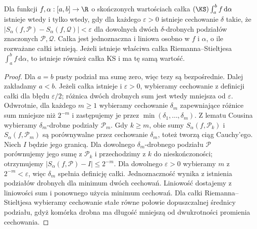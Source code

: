 \begin{twierdzenie}
\label{tw:ks-cauchy}
Dla funkcji $f,\alpha:[a,b]\to\R$ o skończonych wartościach całka $(\KS)\int_a^b f\,\mathrm d\alpha$ istnieje wtedy i tylko wtedy, gdy dla każdego $\varepsilon>0$ istnieje cechowanie $\delta$ takie, że
$|S_\alpha(f,\mathcal P)-S_\alpha(f,\mathcal Q)|<\varepsilon$ dla dowolnych dwóch $\delta$-drobnych podziałów znaczonych $\mathcal P,\mathcal Q$. Całka jest jednoznaczna i liniowa osobno w $f$ i $\alpha$, o ile rozważane całki istnieją. Jeżeli istnieje właściwa całka Riemanna--Stieltjesa $\int_a^b f\,\mathrm d\alpha$, to istnieje również całka KS i ma tę samą wartość.
\end{twierdzenie}
\begin{proof}
Dla $a=b$ pusty podział ma sumę zero, więc tezy są bezpośrednie. Dalej zakładamy $a<b$. Jeżeli całka istnieje i $\varepsilon>0$, wybieramy cechowanie z definicji całki dla błędu $\varepsilon/2$; różnica dwóch drobnych sum jest wtedy mniejsza od $\varepsilon$. Odwrotnie, dla każdego $m\ge1$ wybieramy cechowanie $\delta_m$ zapewniające różnice sum mniejsze niż $2^{-m}$ i zastępujemy je przez $\min(\delta_1,\ldots,\delta_m)$. Z lematu Cousina wybieramy $\delta_m$-drobne podziały $\mathcal P_m$. Gdy $k\ge m$, obie sumy $S_\alpha(f,\mathcal P_k)$ i $S_\alpha(f,\mathcal P_m)$ są porównywalne przez cechowanie $\delta_m$, toteż tworzą ciąg Cauchy'ego. Niech $I$ będzie jego granicą. Dla dowolnego $\delta_m$-drobnego podziału $\mathcal P$ porównujemy jego sumę z $\mathcal P_k$ i przechodzimy z $k$ do nieskończoności; otrzymujemy $|S_\alpha(f,\mathcal P)-I|\le2^{-m}$. Dla dowolnego $\varepsilon>0$ wybieramy $m$ z $2^{-m}<\varepsilon$, więc $\delta_m$ spełnia definicję całki. Jednoznaczność wynika z istnienia podziałów drobnych dla minimum dwóch cechowań. Liniowość dostajemy z liniowości sum i ponownego użycia minimum cechowań. Dla całki Riemanna--Stieltjesa wybieramy cechowanie stałe równe połowie dopuszczalnej średnicy podziału, gdyż komórka drobna ma długość mniejszą od dwukrotności promienia cechowania.
\end{proof}

